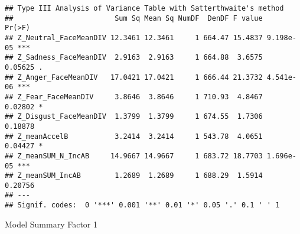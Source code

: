 \documentclass[
]{article}
\begin{document}
\begin{verbatim}
## Type III Analysis of Variance Table with Satterthwaite's method
##                        Sum Sq Mean Sq NumDF  DenDF F value    Pr(>F)    
## Z_Neutral_FaceMeanDIV 12.3461 12.3461     1 664.47 15.4837 9.198e-05 ***
## Z_Sadness_FaceMeanDIV  2.9163  2.9163     1 664.88  3.6575   0.05625 .  
## Z_Anger_FaceMeanDIV   17.0421 17.0421     1 666.44 21.3732 4.541e-06 ***
## Z_Fear_FaceMeanDIV     3.8646  3.8646     1 710.93  4.8467   0.02802 *  
## Z_Disgust_FaceMeanDIV  1.3799  1.3799     1 674.55  1.7306   0.18878    
## Z_meanAccelB           3.2414  3.2414     1 543.78  4.0651   0.04427 *  
## Z_meanSUM_N_IncAB     14.9667 14.9667     1 683.72 18.7703 1.696e-05 ***
## Z_meanSUM_IncAB        1.2689  1.2689     1 688.29  1.5914   0.20756    
## ---
## Signif. codes:  0 '***' 0.001 '**' 0.01 '*' 0.05 '.' 0.1 ' ' 1
\end{verbatim}

Model Summary Factor 1
\end{document}
